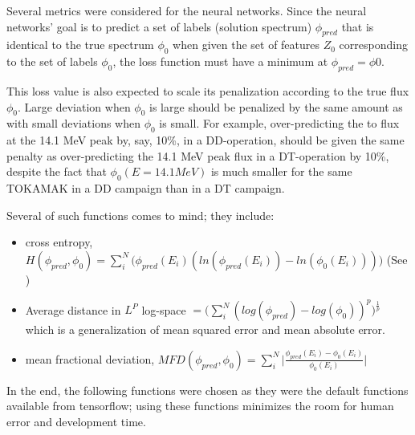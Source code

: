 \documentclass[a4paper, 12pt]{article}
\begin{document}
    Several metrics were considered for the neural networks. Since the neural networks' goal is to predict a set of labels (solution spectrum) $\phi_{pred}$ that is identical to the true spectrum $\phi_{0}$ when given the set of features $Z_{0}$ corresponding to the set of labels $\phi_{0}$, the loss function must have a minimum at $\phi_{pred}=\phi{0}$.

    This loss value is also expected to scale its penalization according to the true flux $\phi_{0}$. Large deviation when $\phi_0$ is large should be penalized by the same amount as with small deviations when $\phi_{0}$ is small. For example, over-predicting the to flux at the 14.1 MeV peak by, say, 10\%, in a DD-operation, should be given the same penalty as over-predicting the 14.1 MeV peak flux in a DT-operation by 10\%, despite the fact that $\phi_{0}(E=14.1 MeV)$ is much smaller for the same TOKAMAK in a DD campaign than in a DT campaign.

    Several of such functions comes to mind; they include:

    \begin{itemize}
        \item cross entropy, $H(\phi_{pred}, \phi_{0}) = \sum_i^N \bigg(\phi_{pred}(E_i)(ln(\phi_{pred}(E_i)) - ln(\phi_{0}(E_i)))\bigg)$ (See \cite{Johnson-Shore-Deriv})
        \item Average distance in $L^P$ log-space $=\bigg(\sum_i^N(log(\phi_{pred})-log(\phi_{0}))^p\bigg)^{\frac{1}{p}}$
        which is a generalization of mean squared error and mean absolute error.
        \item mean fractional deviation, $MFD (\phi_{pred}, \phi_{0}) = \sum_i^N \bigg|\frac{\phi_{pred}(E_i)-\phi_0(E_i)}{\phi_{0}(E_i)}\bigg|$
    \end{itemize}

    In the end, the following functions were chosen as they were the default functions available from tensorflow; using these functions minimizes the room for human error and development time.
\end{document}
